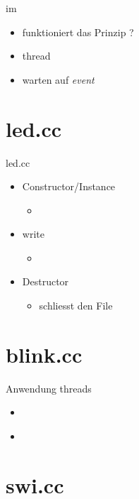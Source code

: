 \begin{frame}{\cpp  im \usp}
 \begin{itemize}
  \item {} funktioniert das Prinzip ?
  \item {} \usp thread
  \item {} warten auf {\em event} 
 \end{itemize}
\end{frame}

\section{led.cc}

\begin{frame}{led.cc}{}
 \begin{itemize}
  \item Constructor/Instance
  \begin{itemize} 
   \item {}
  \end{itemize}
  \item write  
  \begin{itemize} 
   \item {}
  \end{itemize}
  \item Destructor
  \begin{itemize} 
   \item schliesst den File
  \end{itemize}
 \end{itemize}
\end{frame}

\section{blink.cc}

\begin{frame}{}{Anwendung \usp threads}
 \begin{itemize}
  \item \href{http://www.cplusplus.com/reference/thread/thread/}{}
  \item \href{http://en.cppreference.com/w/cpp/chrono/duration}{}
 \end{itemize}
\end{frame}

\section{swi.cc}

